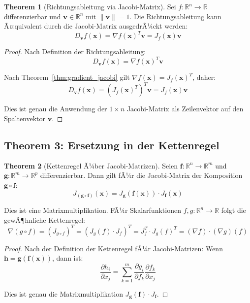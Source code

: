 ﻿\documentclass[a4paper,12pt]{article}
\theoremstyle{definition}
\newtheorem{theorem}{Theorem}
\begin{document}
\begin{theorem}[Richtungsableitung via Jacobi-Matrix]
	\label{thm:directional}
	Sei $f: \mathbb{R}^n \to \mathbb{R}$ differenzierbar und $\boldsymbol{v} \in \mathbb{R}^n$ mit $\|\boldsymbol{v}\| = 1$. Die Richtungsableitung kann Ã¤quivalent durch die Jacobi-Matrix ausgedrÃ¼ckt werden:
	\[
	D_{\boldsymbol{v}} f(\boldsymbol{x}) = \nabla f(\boldsymbol{x})^T \boldsymbol{v} = J_f(\boldsymbol{x}) \boldsymbol{v}
	\]
\end{theorem}

\begin{proof}
	Nach Definition der Richtungsableitung:
	\[
	D_{\boldsymbol{v}} f(\boldsymbol{x}) = \nabla f(\boldsymbol{x})^T \boldsymbol{v}
	\]
	
	Nach Theorem~\ref{thm:gradient_jacobi} gilt $\nabla f(\boldsymbol{x}) = J_f(\boldsymbol{x})^T$, daher:
	\[
	D_{\boldsymbol{v}} f(\boldsymbol{x}) = (J_f(\boldsymbol{x})^T)^T \boldsymbol{v} = J_f(\boldsymbol{x}) \boldsymbol{v}
	\]
	
	Dies ist genau die Anwendung der $1 \times n$ Jacobi-Matrix als Zeilenvektor auf den Spaltenvektor $\boldsymbol{v}$.
\end{proof}

\subsection{Theorem 3: Ersetzung in der Kettenregel}

\begin{theorem}[Kettenregel Ã¼ber Jacobi-Matrizen]
	\label{thm:chain}
	Seien $\boldsymbol{f}: \mathbb{R}^n \to \mathbb{R}^m$ und $\boldsymbol{g}: \mathbb{R}^m \to \mathbb{R}^p$ differenzierbar. Dann gilt fÃ¼r die Jacobi-Matrix der Komposition $\boldsymbol{g} \circ \boldsymbol{f}$:
	\[
	J_{(\boldsymbol{g} \circ \boldsymbol{f})}(\boldsymbol{x}) = J_{\boldsymbol{g}}(\boldsymbol{f}(\boldsymbol{x})) \cdot J_{\boldsymbol{f}}(\boldsymbol{x})
	\]
	
	Dies ist eine Matrixmultiplikation. FÃ¼r Skalarfunktionen $f, g: \mathbb{R}^n \to \mathbb{R}$ folgt die gewÃ¶hnliche Kettenregel:
	\[
	\nabla(g \circ f) = (J_{g \circ f})^T = (J_g(f) \cdot J_f)^T = J_f^T \cdot J_g(f)^T = (\nabla f) \cdot (\nabla g)(f)
	\]
\end{theorem}

\begin{proof}
	Nach der Definition der Kettenregel fÃ¼r Jacobi-Matrizen: Wenn $\boldsymbol{h} = \boldsymbol{g}(\boldsymbol{f}(\boldsymbol{x}))$, dann ist:
	\[
	\frac{\partial h_i}{\partial x_j} = \sum_{k=1}^m \frac{\partial g_i}{\partial f_k} \frac{\partial f_k}{\partial x_j}
	\]
	
	Dies ist genau die Matrixmultiplikation $J_{\boldsymbol{g}}(\boldsymbol{f}) \cdot J_{\boldsymbol{f}}$.
\end{proof}
\end{document}
